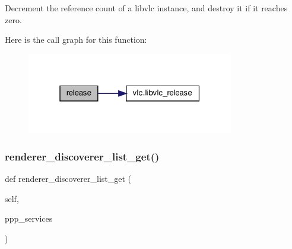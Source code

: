 \begin{DoxyVerb}Decrement the reference count of a libvlc instance, and destroy it
if it reaches zero.
\end{DoxyVerb}
 Here is the call graph for this function\+:
\nopagebreak
\begin{figure}[H]
\begin{center}
\leavevmode
\includegraphics[width=256pt]{classvlc_1_1_instance_a4cd51e19135e5ad4a19eae3ea9c60537_cgraph}
\end{center}
\end{figure}
\mbox{\label{classvlc_1_1_instance_a59e7fce431e7dc8d89fbe9ee7b531340}} 
\subsubsection{\texorpdfstring{renderer\+\_\+discoverer\+\_\+list\+\_\+get()}{renderer\_discoverer\_list\_get()}}
{\footnotesize\ttfamily def renderer\+\_\+discoverer\+\_\+list\+\_\+get (\begin{DoxyParamCaption}\item[{}]{self,  }\item[{}]{ppp\+\_\+services }\end{DoxyParamCaption})}

